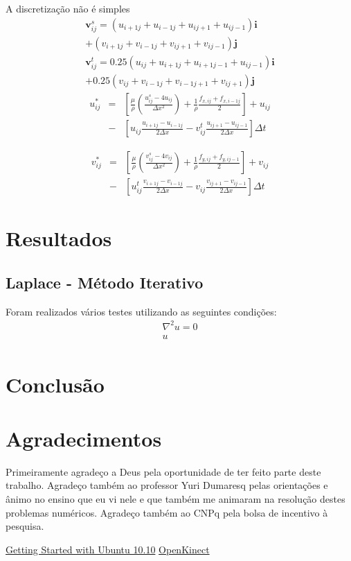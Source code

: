 \documentclass[journal]{IEEEtran}
\begin{document}
A discretização não é simples
\begin{eqnarray}
\textbf{v}_{ij}^s=(u_{i+1j}+u_{i-1j}+u_{ij+1}+u_{ij-1})\textbf{i} 
\nonumber \\+(v_{i+1j}+v_{i-1j}+v_{ij+1}+v_{ij-1})\textbf{j}\\
\textbf{v}_{ij}^t=0.25(u_{ij}+u_{i+1j}+u_{i+1j-1}+u_{ij-1})\textbf{i}\nonumber \\
+0.25(v_{ij}+v_{i-1j}+v_{i-1j+1}+v_{ij+1})\textbf{j}
\end{eqnarray}
\begin{eqnarray}
u_{ij}^{*}&=&\left[\frac{\mu}{\rho}\left(\frac{u_{ij}^s-4u_{ij}}{\Delta
x^2}\right)+\frac{1}{\rho}\frac{f_{x,ij}+f_{x,i-1j}}{2}\right] + u_{ij}\nonumber \\
&-&\left[u_{ij}\frac{u_{i+1j}-u_{i-1j}}{2\Delta
x}-v_{ij}^t\frac{u_{ij+1}-u_{ij-1}}{2\Delta x}\right]\Delta t
\end{eqnarray}

\begin{eqnarray}
v_{ij}^{*}&=&\left[\frac{\mu}{\rho}\left(\frac{v_{ij}^s-4v_{ij}}{\Delta
x^2}\right)+\frac{1}{\rho}\frac{f_{y,ij}+f_{y,ij-1}}{2}\right] + v_{ij}\nonumber \\
&-&\left[u_{ij}^t\frac{v_{i+1j}-v_{i-1j}}{2\Delta
x}-v_{ij}\frac{v_{ij+1}-v_{ij-1}}{2\Delta x}\right]\Delta t
\end{eqnarray}
\section{Resultados}
\subsection{Laplace - Método Iterativo}
Foram realizados vários testes utilizando as seguintes condições:
\begin{eqnarray}
\nabla^2 u=0\\
u_{}
\end{eqnarray}

\section{Conclusão}

\section*{Agradecimentos}

Primeiramente agradeço a Deus pela oportunidade de ter feito parte deste trabalho. Agradeço também ao professor Yuri Dumaresq pelas orientações e ânimo no ensino que eu vi nele e que também me animaram na resolução destes problemas numéricos. Agradeço também ao CNPq pela bolsa de incentivo à pesquisa.

\begin{thebibliography}{4}
  
 \href{ftp://ftp.fisio.cinvestav.mx/Manuales/linux/Getting\%20Started\%20with\%20Ubuntu\%2010.10.pdf}{Getting Started with Ubuntu 10.10}
 \href{http://openkinect.org/wiki/Main_Page}{OpenKinect}
\end{thebibliography}
\end{document}
